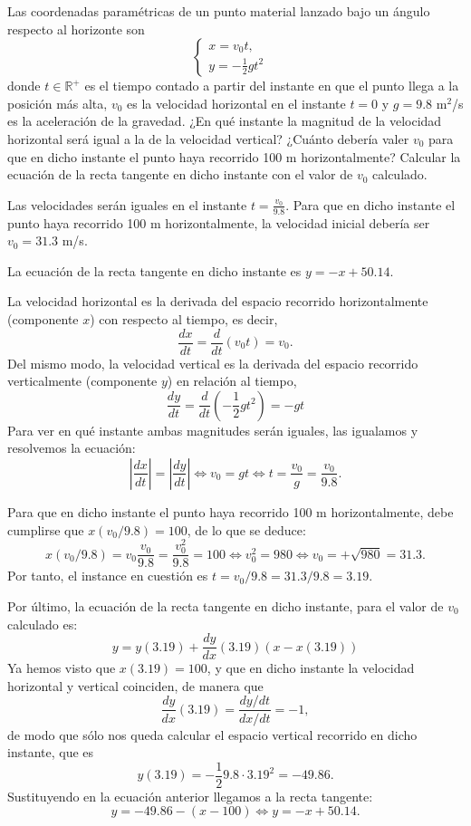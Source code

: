 {Las coordenadas paramétricas de un punto material lanzado bajo un ángulo respecto al horizonte son
\[
\begin{cases}
x=v_0t, & \\
y=-\frac{1}{2}gt^2
\end{cases}
\]
donde $t\in \mathbb{R}^{+}$ es el tiempo contado a partir del instante en que el punto llega a la posición más alta, $v_0$ es la velocidad horizontal en el instante $t=0$ y $g=9.8$ m$^2$/s es la aceleración de la gravedad.
¿En qué instante la magnitud de la velocidad horizontal será igual a la de la velocidad vertical? ¿Cuánto debería valer $v_0$ para que en dicho instante el punto haya recorrido 100 m horizontalmente?
Calcular la ecuación de la recta tangente en dicho instante con el valor de $v_0$ calculado.
}
{
Las velocidades serán iguales en el instante $ t=\frac{v_0}{9.8}$. Para que en dicho instante el punto haya recorrido 100 m horizontalmente,
la velocidad inicial debería ser $v_0 = 31.3$ m/s.

La ecuación de la recta tangente en dicho instante es $y =-x+50.14$.
}
{La velocidad horizontal es la derivada del espacio recorrido horizontalmente (componente $x$) con respecto al tiempo, es decir,
\[
\frac{dx}{dt} = \frac{d}{dt}(v_0t)=v_0.
\]
Del mismo modo, la velocidad vertical es la derivada del espacio recorrido verticalmente (componente $y$) en relación al tiempo,
\[
\frac{dy}{dt} = \frac{d}{dt}(-\frac{1}{2}gt^2)=-gt
\]
Para ver en qué instante ambas magnitudes serán iguales, las igualamos y resolvemos la ecuación:
\[
|\frac{dx}{dt}|=|\frac{dy}{dt}| \Leftrightarrow v_0 = gt \Leftrightarrow t=\frac{v_0}{g}=\frac{v_0}{9.8}.
\]

Para que en dicho instante el punto haya recorrido 100 m horizontalmente, debe cumplirse que $x(v_0/9.8)=100$, de lo que se deduce:
\[
x(v_0/9.8)=v_0\frac{v_0}{9.8} = \frac{v_0^2}{9.8}=100 \Leftrightarrow v_0^2 = 980 \Leftrightarrow v_0 = +\sqrt{980}= 31.3.
\]
Por tanto, el instance en cuestión es $t=v_0/9.8= 31.3/9.8 = 3.19$.

Por último, la ecuación de la recta tangente en dicho instante, para el valor de $v_0$ calculado es:
\[
y = y(3.19) + \frac{dy}{dx}(3.19) (x-x(3.19))
\]
Ya hemos visto que $x(3.19)=100$, y que en dicho instante la velocidad horizontal y vertical coinciden, de manera que
\[
\frac{dy}{dx}(3.19)=\frac{dy/dt}{dx/dt}=-1,
\]
de modo que sólo nos queda calcular el espacio vertical recorrido en dicho instante, que es
\[
y(3.19)=-\frac{1}{2}9.8\cdot 3.19^2= -49.86.
\]
Sustituyendo en la ecuación anterior llegamos a la recta tangente:
\[
y = -49.86-(x-100) \Leftrightarrow y=-x+50.14.
\]
}


